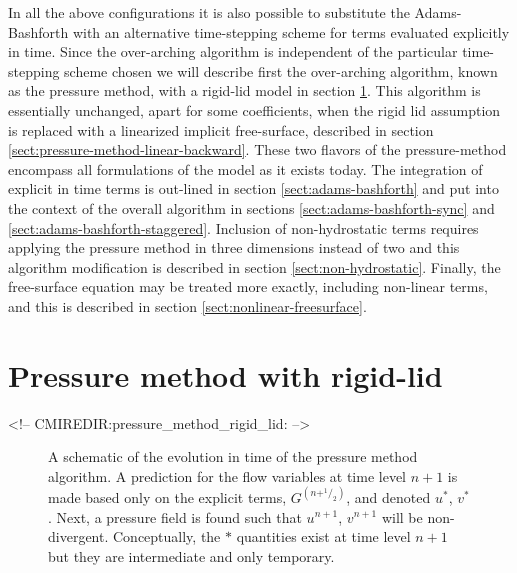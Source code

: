 In all the above configurations it is also possible to substitute the
Adams-Bashforth with an alternative time-stepping scheme for terms
evaluated explicitly in time. Since the over-arching algorithm is
independent of the particular time-stepping scheme chosen we will
describe first the over-arching algorithm, known as the pressure
method, with a rigid-lid model in section
\ref{sect:pressure-method-rigid-lid}. This algorithm is essentially
unchanged, apart for some coefficients, when the rigid lid assumption
is replaced with a linearized implicit free-surface, described in
section \ref{sect:pressure-method-linear-backward}. These two flavors
of the pressure-method encompass all formulations of the model as it
exists today. The integration of explicit in time terms is out-lined
in section \ref{sect:adams-bashforth} and put into the context of the
overall algorithm in sections \ref{sect:adams-bashforth-sync} and
\ref{sect:adams-bashforth-staggered}. Inclusion of non-hydrostatic
terms requires applying the pressure method in three dimensions
instead of two and this algorithm modification is described in section
\ref{sect:non-hydrostatic}. Finally, the free-surface equation may be
treated more exactly, including non-linear terms, and this is
described in section \ref{sect:nonlinear-freesurface}.


\section{Pressure method with rigid-lid}
\label{sect:pressure-method-rigid-lid}
\begin{rawhtml}
<!-- CMIREDIR:pressure_method_rigid_lid: -->
\end{rawhtml}

\begin{figure}
\begin{center}
\end{center}
\caption{
A schematic of the evolution in time of the pressure method
algorithm. A prediction for the flow variables at time level $n+1$ is
made based only on the explicit terms, $G^{(n+^1/_2)}$, and denoted
$u^*$, $v^*$. Next, a pressure field is found such that $u^{n+1}$,
$v^{n+1}$ will be non-divergent. Conceptually, the $*$ quantities
exist at time level $n+1$ but they are intermediate and only
temporary.}
\label{fig:pressure-method-rigid-lid}
\end{figure}

